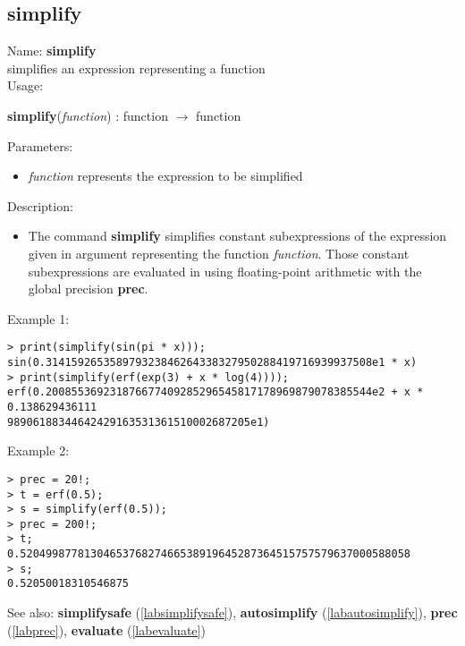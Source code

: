 \subsection{simplify}
\label{labsimplify}
\noindent Name: \textbf{simplify}\\
simplifies an expression representing a function\\

\noindent Usage: 
\begin{center}
\textbf{simplify}(\emph{function}) : \textsf{function} $\rightarrow$ \textsf{function}\\
\end{center}
Parameters: 
\begin{itemize}
\item \emph{function} represents the expression to be simplified
\end{itemize}
\noindent Description: \begin{itemize}

\item The command \textbf{simplify} simplifies constant subexpressions of the
   expression given in argument representing the function
   \emph{function}. Those constant subexpressions are evaluated in using
   floating-point arithmetic with the global precision \textbf{prec}.
\end{itemize}
\noindent Example 1: 
\begin{center}\begin{minipage}{15cm}\begin{Verbatim}[frame=single]
> print(simplify(sin(pi * x)));
sin(0.314159265358979323846264338327950288419716939937508e1 * x)
> print(simplify(erf(exp(3) + x * log(4))));
erf(0.200855369231876677409285296545817178969879078385544e2 + x * 0.138629436111
98906188344642429163531361510002687205e1)
\end{Verbatim}
\end{minipage}\end{center}
\noindent Example 2: 
\begin{center}\begin{minipage}{15cm}\begin{Verbatim}[frame=single]
> prec = 20!;
> t = erf(0.5);
> s = simplify(erf(0.5));
> prec = 200!;
> t;
0.5204998778130465376827466538919645287364515757579637000588058
> s;
0.52050018310546875
\end{Verbatim}
\end{minipage}\end{center}
See also: \textbf{simplifysafe} (\ref{labsimplifysafe}), \textbf{autosimplify} (\ref{labautosimplify}), \textbf{prec} (\ref{labprec}), \textbf{evaluate} (\ref{labevaluate})
